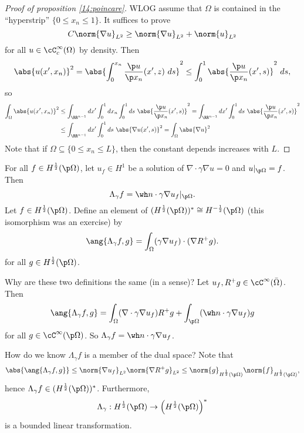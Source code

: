 \begin{proof}[Proof of proposition \ref{14:poincare}]
  WLOG assume that $\Omega$ is contained in the ``hyperstrip'' $\{0\leq x_n\leq1\}$.
  It suffices to prove
  \[ C\norm{\nabla u}_{L^2} \geq \norm{\nabla u}_{L^2} + \norm{u}_{L^2} \]
  for all $u \in \cC_c^\infty(\Omega)$ by density.
  Then
  \[ \abs{u(x',x_n)}^2 = \abs{ \int_0^{x_n} \frac{\p u}{\p x_n}(x',z) \ ds}^2 \leq \int_0^1 \abs{\frac{\p u}{\p x_n}(x',s)}^2 \ ds, \]
  so
  \begin{align*}
    \int_\Omega \abs{u(x',x_n)}^2 &\leq \int_{\RR^{n-1}} dx' \int_0^1 dx_n \int_0^1 ds \ \abs{\frac{\p u}{\p x_n}(x',s)}^2 = \int_{\RR^{n-1}} dx' \int_0^1 ds \ \abs{\frac{\p u}{\p x_n}(x',s)}^2 \\
    &\leq \int_{\RR^{n-1}} dx' \int_0^1 ds \ \abs{\nabla u(x',s)}^2 = \int_\Omega \abs{\nabla u}^2 
  \end{align*}
  Note that if $\Omega \subseteq \{0\leq x_n \leq L\}$, then the constant depends increases with $L$.
\end{proof}

\begin{defn}
  For all $f\in H^\frac12(\p\Omega)$, let $u_f\in H^1$ be a solution of $\nabla\cdot\gamma\nabla u=0$ and $u|_{\p\Omega}=f$.
  Then
  \[ \Lambda_\gamma f = \wh n \cdot \gamma\nabla u_f|_{\p\Omega}. \]
  Let $f\in H^\frac12(\p\Omega)$.
  Define an element of $(H^\frac12(\p\Omega))^* \cong H^{-\frac12}(\p\Omega)$ (this isomorphism was an exercise) by
  \[ \ang{\Lambda_\gamma f,g} = \int_\Omega (\gamma\nabla u_f)\cdot(\nabla R^+g). \]
  for all $g\in H^\frac12(\p\Omega)$.
\end{defn}

\begin{rmk}
  Why are these two definitions the same (in a sense)?
  Let $u_f, R^+g \in \cC^\infty(\bar\Omega)$.
  Then
  \[ \ang{\Lambda_\gamma f,g} = \int_\Omega (\nabla\cdot\gamma\nabla u_f) R^+g + \int_{\p\Omega} (\wh n\cdot\gamma\nabla u_f)g \]
  for all $g\in \cC^\infty(\p\Omega)$.
  So $\Lambda_\gamma f = \wh n\cdot\gamma\nabla u_f$.
\end{rmk}

\begin{rmk}
  How do we know $\Lambda_\gamma f$ is a member of the dual space?
  Note that
  \[ \abs{\ang{\Lambda_\gamma f,g}} \leq \norm{\nabla u_f}_{L^2} \norm{\nabla R^+g}_{L^2} \leq \norm{g}_{H^\frac12(\p\Omega)}\norm{f}_{H^\frac12(\p\Omega)}, \]
  hence $\Lambda_\gamma f \in (H^\frac12(\p\Omega))^*$.
  Furthermore,
  \[ \Lambda_\gamma: H^\frac12(\p\Omega) \to \left( H^\frac12(\p\Omega) \right)^* \]
  is a bounded linear transformation.
\end{rmk}
